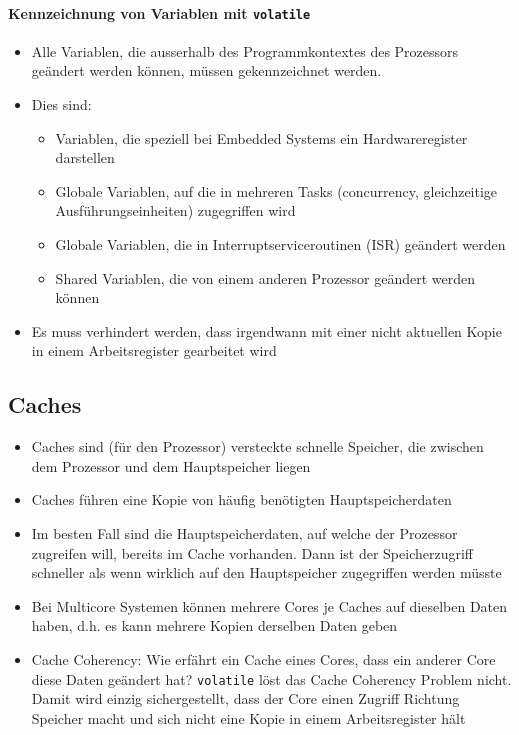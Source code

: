 \paragraph{Kennzeichnung von Variablen mit \lstinline{volatile}}
\begin{itemize}
	\item Alle Variablen, die ausserhalb des Programmkontextes des Prozessors geändert werden können, müssen gekennzeichnet werden.
	\item Dies sind:
	\begin{itemize}
		\item Variablen, die speziell bei Embedded Systems ein Hardwareregister darstellen
		\item Globale Variablen, auf die in mehreren Tasks (concurrency, gleichzeitige Ausführungseinheiten) zugegriffen wird
		\item Globale Variablen, die in Interruptserviceroutinen (ISR) geändert werden
		\item Shared Variablen, die von einem anderen Prozessor geändert werden können
	\end{itemize}
	\item Es muss verhindert werden, dass irgendwann mit einer nicht aktuellen Kopie in einem Arbeitsregister gearbeitet wird
\end{itemize}

\newpage

\subsection{Caches}
\begin{itemize}
	\item Caches sind (für den Prozessor) versteckte schnelle Speicher, die zwischen dem Prozessor und dem Hauptspeicher liegen
	\item Caches führen eine Kopie von häufig benötigten Hauptspeicherdaten
	\item Im besten Fall sind die Hauptspeicherdaten, auf welche der Prozessor zugreifen will, bereits im Cache vorhanden.  Dann ist der Speicherzugriff schneller als wenn wirklich auf den Hauptspeicher zugegriffen werden müsste
	\item Bei Multicore Systemen können mehrere Cores je Caches auf dieselben Daten haben, d.h. es kann mehrere Kopien derselben Daten geben
	\item Cache Coherency: Wie erfährt ein Cache eines Cores, dass ein anderer Core diese Daten geändert hat? \lstinline{volatile} löst das Cache Coherency Problem nicht. Damit wird einzig sichergestellt, dass der Core einen Zugriff Richtung Speicher macht und sich nicht eine Kopie in einem Arbeitsregister hält
\end{itemize}

